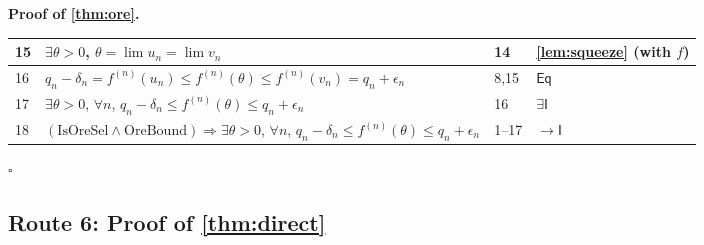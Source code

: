 \documentclass[11pt,reqno]{amsart}
\theoremstyle{blueplain}
\renewcommand{\qedsymbol}{\textcolor{proofqed}{\ensuremath{\square}}}
\renewenvironment{proof}[1][Proof]{\par\noindent\textbf{\textcolor{proofhead}{#1.}}\par\nobreak}{\par\nobreak\hfill\qedsymbol}
\numberwithin{equation}{section}
\begin{document}
\begin{proof}[\textbf{Proof of \cref{thm:ore}}]
{\begin{tabular}{|m{0.7cm}|m{12cm}|m{1.4cm}|m{2.5cm}|}
			15 & $\exists\theta>0$, $\theta=\lim u_n=\lim v_n$ & 14 & \cref{lem:squeeze} (with $f$) \\ \hline
			16 & $q_n-\delta_n=f^{(n)}(u_n)\le f^{(n)}(\theta)\le f^{(n)}(v_n)=q_n+\epsilon_n$ & 8,15 & $\mathsf{Eq}$ \\ \hline
			17 & $\exists\theta>0$, $\forall n$, $q_n-\delta_n\le f^{(n)}(\theta)\le q_n+\epsilon_n$ & 16 & $\exists\mathsf{I}$ \\ \hline
			18 & $(\mathrm{IsOreSel}\wedge\mathrm{OreBound})\Rightarrow\exists\theta>0$, $\forall n$, $q_n-\delta_n\le f^{(n)}(\theta)\le q_n+\epsilon_n$ & 1--17 & $\rightarrow\mathsf{I}$ \\ \hline
		\end{tabular}
	}
\end{proof}

\subsection{Route 6: Proof of \cref{thm:direct}}
\end{document}
